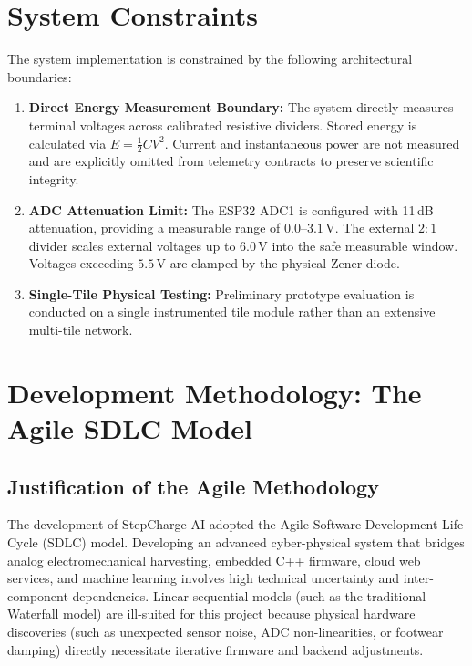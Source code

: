 \section{System Constraints}
The system implementation is constrained by the following architectural boundaries:
\begin{enumerate}
    \item \textbf{Direct Energy Measurement Boundary:} The system directly measures terminal voltages across calibrated resistive dividers. Stored energy is calculated via $E = \frac{1}{2} C V^2$. Current and instantaneous power are not measured and are explicitly omitted from telemetry contracts to preserve scientific integrity.
    \item \textbf{ADC Attenuation Limit:} The ESP32 ADC1 is configured with 11\,dB attenuation, providing a measurable range of $0.0\text{--}3.1\,\text{V}$. The external $2:1$ divider scales external voltages up to $6.0\,\text{V}$ into the safe measurable window. Voltages exceeding $5.5\,\text{V}$ are clamped by the physical Zener diode.
    \item \textbf{Single-Tile Physical Testing:} Preliminary prototype evaluation is conducted on a single instrumented tile module rather than an extensive multi-tile network.
\end{enumerate}

\section{Development Methodology: The Agile SDLC Model}

\subsection{Justification of the Agile Methodology}
The development of StepCharge AI adopted the Agile Software Development Life Cycle (SDLC) model. Developing an advanced cyber-physical system that bridges analog electromechanical harvesting, embedded C++ firmware, cloud web services, and machine learning involves high technical uncertainty and inter-component dependencies. Linear sequential models (such as the traditional Waterfall model) are ill-suited for this project because physical hardware discoveries (such as unexpected sensor noise, ADC non-linearities, or footwear damping) directly necessitate iterative firmware and backend adjustments.

